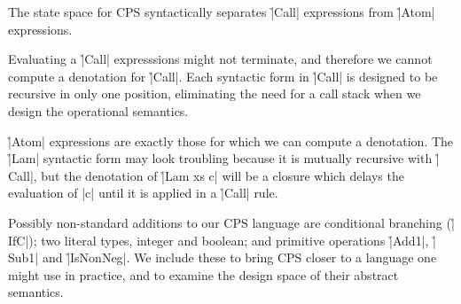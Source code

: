 The state space for CPS syntactically separates \h|Call| expressions from \h|Atom|
expressions.
%


Evaluating a \h|Call| expresssions might not terminate, and therefore we cannot
compute a denotation for \h|Call|.
%
Each syntactic form in \h|Call| is designed to be recursive in only one position,
eliminating the need for a call stack when we design the operational semantics.


\h|Atom| expressions are exactly those for which we can compute a denotation.
%
The \h|Lam| syntactic form may look troubling because it is mutually recursive
with \h|Call|, but the denotation of \h|Lam xs c| will be a closure which delays
the evaluation of \p|c| until it is applied in a \h|Call| rule.


Possibly non-standard additions to our CPS language are conditional branching
(\h|IfC|); two literal types, integer and boolean; and primitive operations
\h|Add1|, \h|Sub1| and \h|IsNonNeg|.
%
We include these to bring CPS closer to a language one might use in practice,
and to examine the design space of their abstract semantics.

